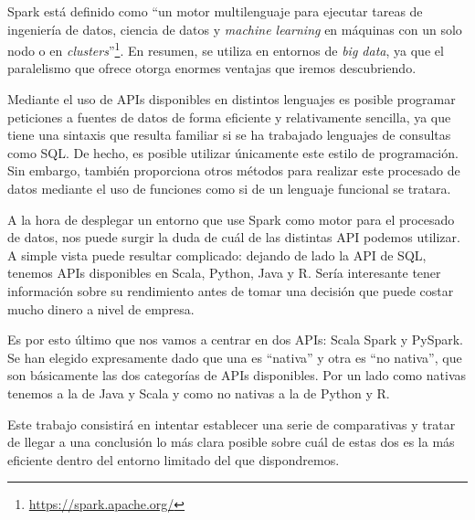 \documentclass[12pt,twoside,titlepage]{report}
\newcommand{\quotes}[1]{``#1''}
\newcommand\blankpage{%
    \newpage
    \null
    \thispagestyle{empty}%
    \newpage}
\begin{document}

\pagestyle{fancy}


\setlength{\parskip}{0.75em}
\renewcommand{\baselinestretch}{1.25}
\setcounter{page}{1}


Spark está definido como \quotes{un motor multilenguaje para ejecutar tareas de ingeniería de datos, ciencia de datos y \textit{machine learning} en máquinas con un solo nodo o en \textit{clusters}}\footnote{\url{https://spark.apache.org/}}. En resumen, se utiliza en entornos de \textit{big data}, ya que el paralelismo que ofrece otorga enormes ventajas que iremos descubriendo.

Mediante el uso de APIs disponibles en distintos lenguajes es posible programar peticiones a fuentes de datos de forma eficiente y relativamente sencilla, ya que tiene una sintaxis que resulta familiar si se ha trabajado lenguajes de consultas como SQL. De hecho, es posible utilizar únicamente este estilo de programación. Sin embargo, también proporciona otros métodos para realizar este procesado de datos mediante el uso de funciones como si de un lenguaje funcional se tratara.

A la hora de desplegar un entorno que use Spark como motor para el procesado de datos, nos puede surgir la duda de cuál de las distintas API podemos utilizar. A simple vista puede resultar complicado: dejando de lado la API de SQL, tenemos APIs disponibles en Scala, Python, Java y R. Sería interesante tener información sobre su rendimiento antes de tomar una decisión que puede costar mucho dinero a nivel de empresa.

Es por esto último que nos vamos a centrar en dos APIs: Scala Spark y PySpark. Se han elegido expresamente dado que una es \quotes{nativa} y otra es \quotes{no nativa}, que son básicamente las dos categorías de APIs disponibles. Por un lado como nativas tenemos a la de Java y Scala y como no nativas a la de Python y R.

Este trabajo consistirá en intentar establecer una serie de comparativas y tratar de llegar a una conclusión lo más clara posible sobre cuál de estas dos es la más eficiente dentro del entorno limitado del que dispondremos.


\end{document}
